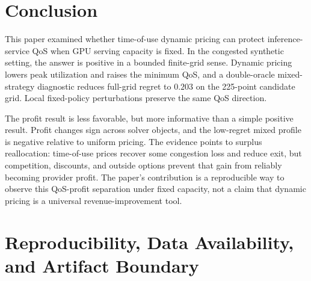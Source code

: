 \documentclass[11pt,a4paper]{article}
\begin{document}
\section{Conclusion}
\label{sec:conclusion}

This paper examined whether time-of-use dynamic pricing can protect inference-service QoS when GPU serving capacity is fixed. In the congested synthetic setting, the answer is positive in a bounded finite-grid sense. Dynamic pricing lowers peak utilization and raises the minimum QoS, and a double-oracle mixed-strategy diagnostic reduces full-grid regret to $0.203$ on the 225-point candidate grid. Local fixed-policy perturbations preserve the same QoS direction.

The profit result is less favorable, but more informative than a simple positive result. Profit changes sign across solver objects, and the low-regret mixed profile is negative relative to uniform pricing. The evidence points to surplus reallocation: time-of-use prices recover some congestion loss and reduce exit, but competition, discounts, and outside options prevent that gain from reliably becoming provider profit. The paper's contribution is a reproducible way to observe this QoS-profit separation under fixed capacity, not a claim that dynamic pricing is a universal revenue-improvement tool.

\section*{Reproducibility, Data Availability, and Artifact Boundary}
\end{document}
